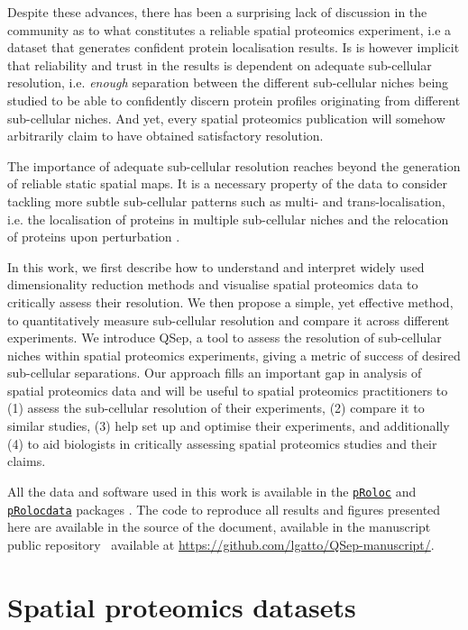 \documentclass[12pt]{article}\usepackage[]{graphicx}\usepackage[]{color}
\newcommand{\Rpackage}[1]{\texttt{#1}}
\newcommand\Biocpkg[1]{%
  {\href{http://bioconductor.org/packages/#1}%
    {\Rpackage{#1}}}}
\newcommand\Biocexptpkg[1]{\Biocpkg{#1}}
\begin{document}
Despite these advances, there has been a surprising lack of discussion
in the community as to what constitutes a reliable spatial proteomics
experiment, i.e a dataset that generates confident protein
localisation results. Is is however implicit that reliability and
trust in the results is dependent on adequate sub-cellular resolution,
i.e. \textit{enough} separation between the different sub-cellular
niches being studied to be able to confidently discern protein
profiles originating from different sub-cellular niches. And yet,
every spatial proteomics publication will somehow arbitrarily claim to
have obtained satisfactory resolution.

The importance of adequate sub-cellular resolution reaches beyond the
generation of reliable static spatial maps. It is a necessary property
of the data to consider tackling more subtle sub-cellular patterns
such as multi- and trans-localisation, i.e. the localisation of
proteins in multiple sub-cellular niches and the relocation of
proteins upon perturbation \citep{Gatto:2014}.

\bigskip

In this work, we first describe how to understand and interpret widely
used dimensionality reduction methods and visualise spatial proteomics
data to critically assess their resolution. We then propose a simple,
yet effective method, to quantitatively measure sub-cellular
resolution and compare it across different experiments. We introduce
QSep, a tool to assess the resolution of sub-cellular niches within
spatial proteomics experiments, giving a metric of success of desired
sub-cellular separations. Our approach fills an important gap in
analysis of spatial proteomics data and will be useful to spatial
proteomics practitioners to (1) assess the sub-cellular resolution of
their experiments, (2) compare it to similar studies, (3) help set up
and optimise their experiments, and additionally (4) to aid biologists
in critically assessing spatial proteomics studies and their claims.

All the data and software used in this work is available in the
\Biocpkg{pRoloc} and \Biocexptpkg{pRolocdata} packages
\citep{Gatto:2014a}. The code to reproduce all results and figures
presented here are available in the source of the document, available
in the manuscript public repository~\cite{qseprepo} available at
\url{https://github.com/lgatto/QSep-manuscript/}.

\section{Spatial proteomics datasets}\label{sec:pdata}
\end{document}
